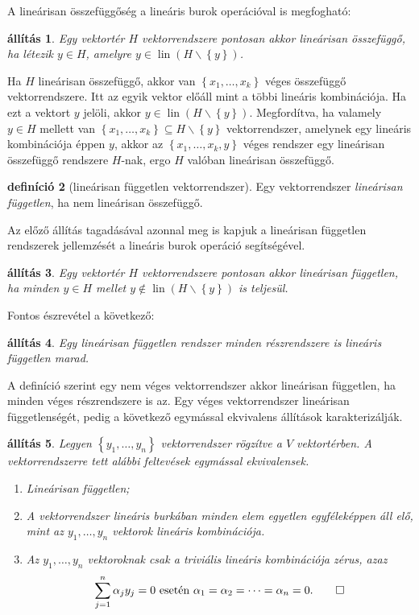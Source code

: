 \documentclass[a4paper, showtrims]{memoir}
\makeatletter
\renewenvironment{proof}[1][\proofname]
    {\par\pushQED{\qed}%
    \normalfont \topsep6\p@\@plus6\p@\relax
    \trivlist
    \item[\hskip\labelsep
        \itshape
    #1\@addpunct{:}]\ignorespaces}
    {\popQED\endtrivlist\@endpefalse}
\theoremstyle{plain}
\newtheorem{proposition}{állítás}[chapter]
\theoremstyle{remark}
\theoremstyle{definition}
\newtheorem{definition}[proposition]{definíció}
\DeclareMathOperator{\lin}{lin}
\makeatother
\begin{document}
A lineárisan összefüggőség a lineáris burok operációval is megfogható:
\begin{proposition}
    Egy vektortér $H$ vektorrendszere pontosan akkor lineárisan összefüggő, ha létezik $y\in H$, amelyre $y\in\lin(H\smallsetminus\left\{ y \right\})$.
\end{proposition}
\begin{proof}
    Ha $H$ lineárisan összefüggő, akkor van $\left\{ x_1,\ldots,x_k \right\}$ véges összefüggő vektorrendszere.
    Itt az egyik vektor előáll mint a többi lineáris kombinációja. 
    Ha ezt a vektort $y$ jelöli, akkor $y\in\lin\left( H\smallsetminus\left\{ y \right\} \right)$.
    Megfordítva, ha valamely $y\in H$ mellett van $\left\{ x_1,\ldots,x_k \right\}\subseteq H\smallsetminus\left\{ y \right\}$ vektorrendszer, amelynek egy lineáris kombinációja éppen $y$, 
    akkor az $\left\{ x_1,\ldots,x_k,y \right\}$ véges rendszer egy lineárisan összefüggő rendszere $H$-nak, ergo $H$ valóban lineárisan összefüggő.
\end{proof}
\begin{definition}[lineárisan független vektorrendszer]
	Egy vektorrendszer \emph{lineárisan független}, ha nem lineárisan összefüggő.
\end{definition}
Az előző állítás tagadásával azonnal meg is kapjuk a lineárisan független rendszerek jellemzését
a lineáris burok operáció segítségével.
\begin{proposition}
    Egy vektortér $H$ vektorrendszere pontosan akkor lineárisan független, ha minden $y\in H$ mellet $y\notin\lin(H\smallsetminus\left\{ y \right\})$ is teljesül.
\end{proposition}
Fontos észrevétel a következő:
\begin{proposition}
    Egy lineárisan független rendszer minden részrendszere is lineáris független marad.
\end{proposition}
A definíció szerint egy nem véges vektorrendszer akkor lineárisan független, ha minden véges részrendszere is az.
Egy véges vektorrendszer lineárisan függetlenségét, pedig a következő egymással ekvivalens állítások karakterizálják.
\begin{proposition}
	Legyen $\left\{ y_1,\ldots,y_n \right\}$ vektorrendszer rögzítve a $V$ vektortérben.
	A vektorrendszerre tett alábbi feltevések egymással ekvivalensek.
	\begin{enumerate}
		\item Lineárisan független;
		\item A vektorrendszer lineáris burkában minden elem egyetlen egyféleképpen áll elő,
		      mint az $y_1,\ldots,y_n$ vektorok lineáris kombinációja.
		\item Az $y_1,\ldots,y_n$ vektoroknak csak a \emph{triviális lineáris kombinációja} zérus,
		      azaz
		      \[
			      \sum_{j=1}^n\alpha_jy_j=0\text{ esetén }\alpha_1=\alpha_2=\dots=\alpha_n=0.\qedhere
		      \]
	\end{enumerate}
\end{proposition}
\end{document}
